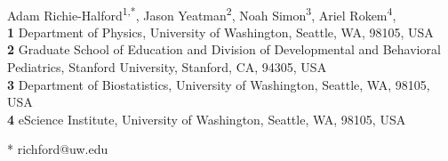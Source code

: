 \documentclass[10pt,letterpaper]{article}
\begin{document}
\vspace*{0.2in}

\begin{flushleft}
{\Large
\textbf{} %
}
\newline
\\
Adam Richie-Halford\textsuperscript{1,*},
Jason Yeatman\textsuperscript{2},
Noah Simon\textsuperscript{3},
Ariel Rokem\textsuperscript{4},
\\
\bigskip
\textbf{1} Department of Physics, University of Washington, Seattle, WA, 98105, USA
\\
\textbf{2} Graduate School of Education and Division of Developmental and Behavioral Pediatrics, Stanford University, Stanford, CA, 94305, USA
\\
\textbf{3} Department of Biostatistics, University of Washington, Seattle, WA, 98105, USA
\\
\textbf{4} e{S}cience Institute, University of Washington, Seattle, WA, 98105, USA
\\
\bigskip

%
* richford@uw.edu

\end{flushleft}





\linenumbers



\nolinenumbers



\end{document}
